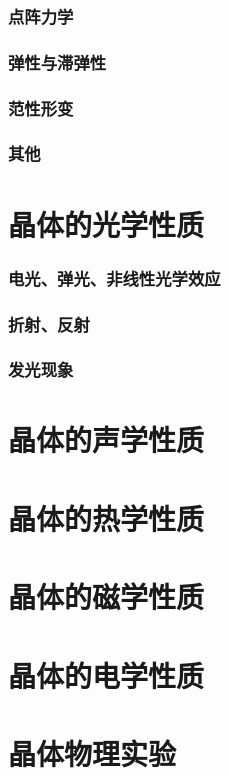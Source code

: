 \documentclass[UTF8]{../NatureUniverse}
\begin{document}
    \subsubsection{点阵力学}
    \subsubsection{弹性与滞弹性}
    \subsubsection{范性形变}
    \subsubsection{其他}
\section{晶体的光学性质}
    \subsubsection{电光、弹光、非线性光学效应}
    \subsubsection{折射、反射}
    \subsubsection{发光现象}
\section{晶体的声学性质}
\section{晶体的热学性质}
\section{晶体的磁学性质}
\section{晶体的电学性质}
\section{晶体物理实验}
\end{document}
